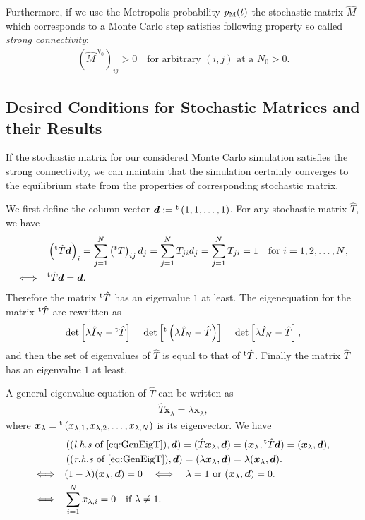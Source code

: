 Furthermore, if we use the Metropolis probability $p_{\rm M}(t)$ the stochastic matrix $\hat{M}$ which corresponds to a Monte Carlo step satisfies following property so called \textit{strong connectivity}:
\begin{align}
\left(\hat{M}^{N_{0}}\right)_{ij}>0\quad\text{for arbitrary $(i,j)$ at a $N_{0}>0$}.
\end{align}

\subsection{Desired Conditions for Stochastic Matrices and their Results}

If the stochastic matrix for our considered Monte Carlo simulation satisfies the strong connectivity, we can maintain that the simulation certainly converges to the equilibrium state from the properties of corresponding stochastic matrix.

We first define the column vector $\bm{d}:={}^{\rm t}\left(1,1,\dots,1\right)$. For any stochastic matrix $\hat{T}$, we have
\begin{align}
&\left({}^{\rm t}\hat{T}\bm{d}\right)_{i}=\sum_{j=1}^{N}\left({}^{t}T\right)_{ij}d_{j}=\sum_{j=1}^{N}T_{ji}d_{j}=\sum_{j=1}^{N}T_{ji}=1\quad\text{for $i=1,2,\dots,N$},\\
\Longleftrightarrow\quad &{}^{\rm t}\hat{T}\bm{d} = \bm{d}.
\end{align}
Therefore the matrix ${}^{\rm t}\hat{T}$ has an eigenvalue $1$ at least. The eigenequation for the matrix ${}^{\rm t}\hat{T}$ are rewritten as
\begin{align}
\det\left[\lambda \hat{I}_{N} - {}^{\rm t}\hat{T}\right] = \det\left[{}^{\rm t}\left(\lambda \hat{I}_{N} - \hat{T}\right)\right] = \det\left[\lambda \hat{I}_{N} - \hat{T}\right],
\end{align}
and then the set of eigenvalues of $\hat{T}$ is equal to that of ${}^{\rm t}\hat{T}$. Finally the matrix $\hat{T}$ has an eigenvalue $1$ at least.

A general eigenvalue equation of $\hat{T}$ can be written as
\begin{align}
\hat{T}\bm{x}_{\lambda} = \lambda\bm{x}_{\lambda}\label{eq:GenEigT},
\end{align}
where $\bm{x}_{\lambda}={}^{\rm t}\left(x_{\lambda,1},x_{\lambda,2},\dots,x_{\lambda,N}\right)$ is its eigenvector. We have
\begin{align}
&\left((\text{\textit{l.h.s} of \ref{eq:GenEigT}}),\bm{d}\right) = (\hat{T}\bm{x}_{\lambda},\bm{d}) = (\bm{x}_{\lambda},{}^{\rm t}\hat{T}\bm{d}) = (\bm{x}_{\lambda},\bm{d}),\\
&\left((\text{\textit{r.h.s} of \ref{eq:GenEigT}}),\bm{d}\right) = (\lambda\bm{x}_{\lambda},\bm{d}) = \lambda(\bm{x}_{\lambda},\bm{d}).\\
\Longleftrightarrow \quad& (1-\lambda)(\bm{x}_{\lambda},\bm{d}) = 0\quad\Longleftrightarrow \quad \lambda = 1\text{ or }(\bm{x}_{\lambda},\bm{d}) = 0.\\
\Longleftrightarrow \quad& \sum_{i=1}^{N}x_{\lambda,i} = 0\quad\text{if $\lambda \neq 1$}.
\end{align}

